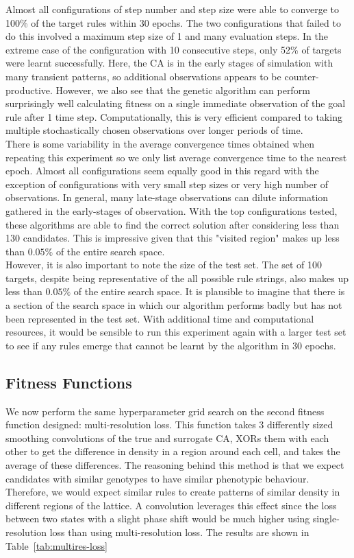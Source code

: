 Almost all configurations of step number and step size were able to converge to 100\% of the target rules within 30 epochs. The two configurations that failed to do this involved a maximum step size of 1 and many evaluation steps. In the extreme case of the configuration with 10 consecutive steps, only 52\% of targets were learnt successfully. Here, the CA is in the early stages of simulation with many transient patterns, so additional observations appears to be counter-productive. However, we also see that the genetic algorithm can perform surprisingly well calculating fitness on a single immediate observation of the goal rule after 1 time step. Computationally, this is very efficient compared to taking multiple stochastically chosen observations over longer periods of time. \\

There is some variability in the average convergence times obtained when repeating this experiment so we only list average convergence time to the nearest epoch. Almost all configurations seem equally good in this regard with the exception of configurations with very small step sizes or very high number of observations. In general, many late-stage observations can dilute information gathered in the early-stages of observation. With the top configurations tested, these algorithms are able to find the correct solution after considering less than 130 candidates. This is impressive given that this "visited region" makes up less than $0.05\%$ of the entire search space.\\

However, it is also important to note the size of the test set. The set of 100 targets, despite being representative of the all possible rule strings, also makes up less than $0.05\%$ of the entire search space. It is plausible to imagine that there is a section of the search space in which our algorithm performs badly but has not been represented in the test set. With additional time and computational resources, it would be sensible to run this experiment again with a larger test set to see if any rules emerge that cannot be learnt by the algorithm in 30 epochs.

\subsection{Fitness Functions}

We now perform the same hyperparameter grid search on the second fitness function designed: multi-resolution loss. This function takes 3 differently sized smoothing convolutions of the true and surrogate CA, XORs them with each other to get the difference in density in a region around each cell, and takes the average of these differences. The reasoning behind this method is that we expect candidates with similar genotypes to have similar phenotypic behaviour. Therefore, we would expect similar rules to create patterns of similar density in different regions of the lattice. A convolution leverages this effect since the loss between two states with a slight phase shift would be much higher using single-resolution loss than using multi-resolution loss. The results are shown in Table~\ref{tab:multires-loss}\\

